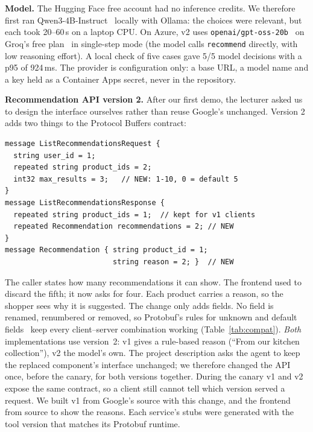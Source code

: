 \documentclass[conference]{IEEEtran}
\begin{document}
\textbf{Model.} The Hugging Face free account had no inference credits. We
therefore first ran Qwen3-4B-Instruct~\cite{qwen3} locally with Ollama: the
choices were relevant, but each took 20--60\,s on a laptop CPU. On Azure,
v2 uses \texttt{openai/gpt-oss-20b}~\cite{gptoss} on Groq's free
plan~\cite{groq} in single-step mode (the model calls \texttt{recommend}
directly, with low reasoning effort). A local check of five cases gave 5/5
model decisions with a p95 of 924\,ms. The provider is configuration only:
a base URL, a model name and a key held as a Container Apps secret, never in
the repository.

\textbf{Recommendation API version 2.}\label{sec:api} After our first demo,
the lecturer asked us to design the interface ourselves rather than reuse
Google's unchanged. Version 2 adds two things to the Protocol Buffers
contract:

\begin{lstlisting}
message ListRecommendationsRequest {
  string user_id = 1;
  repeated string product_ids = 2;
  int32 max_results = 3;   // NEW: 1-10, 0 = default 5
}
message ListRecommendationsResponse {
  repeated string product_ids = 1;  // kept for v1 clients
  repeated Recommendation recommendations = 2; // NEW
}
message Recommendation { string product_id = 1;
                         string reason = 2; }  // NEW
\end{lstlisting}

The caller states how many recommendations it can show. The frontend used
to discard the fifth; it now asks for four. Each product carries a reason,
so the shopper sees why it is suggested. The change only adds fields. No
field is renamed, renumbered or removed, so Protobuf's rules for unknown and
default fields~\cite{protobuf} keep every client--server combination
working (Table~\ref{tab:compat}). \emph{Both} implementations
use version~2: v1 gives a rule-based reason (``From our kitchen
collection''), v2 the model's own. The project description asks the agent
to keep the replaced component's interface unchanged; we therefore changed
the API once, before the canary, for both versions together. During the
canary v1 and v2 expose the same contract, so a client still cannot tell
which version served a request. We built v1 from Google's
source with this change, and the frontend from source to show the reasons.
Each service's stubs were generated with the tool version that matches its
Protobuf runtime.
\end{document}

